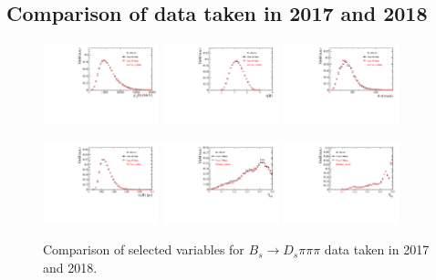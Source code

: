 \clearpage
\subsection*{Comparison of data taken in 2017 and 2018}
\label{ssec:16vs17}

\begin{figure}[h]
\centering
\includegraphics[height=!,width=0.3\textwidth]{figs/dataVsMC/year18vs17_norm/Ds2all_Bs_PT.pdf}
\includegraphics[height=!,width=0.3\textwidth]{figs/dataVsMC/year18vs17_norm/Ds2all_Bs_ETA.pdf}
\includegraphics[height=!,width=0.3\textwidth]{figs/dataVsMC/year18vs17_norm/Ds2all_NTracks.pdf}


\includegraphics[height=!,width=0.3\textwidth]{figs/dataVsMC/year18vs17_norm/Ds2all_Bs_BsDTF_TAUERR.pdf}
\includegraphics[height=!,width=0.3\textwidth]{figs/dataVsMC/year18vs17_norm/Ds2all_OS_Combination_PROB.pdf}
\includegraphics[height=!,width=0.3\textwidth]{figs/dataVsMC/year18vs17_norm/Ds2all_SS_Kaon_PROB.pdf}

\caption{Comparison of selected variables for $B_s \to D_s \pi \pi \pi$ data taken in 2017 and 2018.}
\label{fig:Norm_18v17}
\end{figure}

